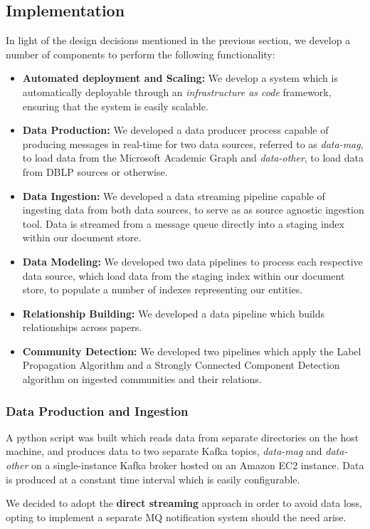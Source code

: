 \documentclass[10pt,journal,final,a4paper]{IEEEtran}
\begin{document}
\subsection{Implementation}
In light of the design decisions mentioned in the previous section, we develop a number of components to perform the following functionality:
\begin{itemize}
\item \textbf{Automated deployment and Scaling:} We develop a system which is automatically deployable through an \textit{infrastructure as code} framework, ensuring that the system is easily scalable. 
\item \textbf{Data Production:} We developed a data producer process capable of producing messages in real-time for two data sources, referred to as \textit{data-mag}, to load data from the Microsoft Academic Graph and \textit{data-other}, to load data from DBLP sources or otherwise. 
\item \textbf{Data Ingestion:} We developed a data streaming pipeline capable of ingesting data from both data sources, to serve as as source agnostic ingestion tool. Data is streamed from a message queue directly  into a staging index within our document store.
\item \textbf{Data Modeling:} We developed two data pipelines to process each respective data source, which load data from the staging index within our document store, to populate a number of indexes representing our entities.
\item \textbf{Relationship Building:} We developed a data pipeline which builds relationships across papers.
\item \textbf{Community Detection:} We developed two pipelines which apply the Label Propagation Algorithm and a Strongly Connected Component Detection algorithm on ingested communities and their relations.
\end{itemize}

\subsubsection{Data Production and Ingestion}
A python script was built which reads data from separate directories on the host machine, and produces data to two separate Kafka topics, \textit{data-mag} and \textit{data-other} on a single-instance Kafka broker hosted on an Amazon EC2 instance. Data is produced at a constant time interval which is easily configurable.


We decided to adopt the \textbf{direct streaming} approach in order to avoid data loss, opting to implement a separate MQ notification system should the need arise.
\end{document}
